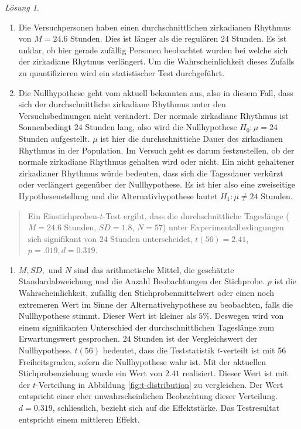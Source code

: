 \documentclass[
]{book}
\providecommand{\tightlist}{%
  \setlength{\itemsep}{0pt}\setlength{\parskip}{0pt}}
\theoremstyle{definition}
\theoremstyle{definition}
\theoremstyle{definition}
\theoremstyle{definition}
\theoremstyle{remark}
\newtheorem*{solution}{Lösung}
\begin{document}
\begin{solution}
\begin{enumerate}
\def\labelenumi{\alph{enumi})}
\tightlist
\item
  Die Versuchpersonen haben einen durchschnittlichen zirkadianen Rhythmus von \(M = 24.6\) Stunden. Dies ist länger als die regulären \(24\) Stunden. Es ist unklar, ob hier gerade zufällig Personen beobachtet wurden bei welche sich der zirkadiane Rhytmus verlängert. Um die Wahrscheinlichkeit dieses Zufalls zu quantifizieren wird ein statistischer Test durchgeführt.
\item
  Die Nullhypothese geht vom aktuell bekannten aus, also in diesem Fall, dass sich der durchschnittliche zirkadiane Rhythmus unter den Versuchsbedinungen nicht verändert. Der normale zirkadiane Rhythmus ist Sonnenbedingt \(24\) Stunden lang, also wird die Nullhypothese \(H_0: \mu = 24\) Stunden aufgestellt. \(\mu\) ist hier die durchschnittiche Dauer des zirkadianen Rhythmus in der Population. Im Versuch geht es darum festzustellen, ob der normale zirkadiane Rhythmus gehalten wird oder nicht. Ein nicht gehaltener zirkadianer Rhythmus würde bedeuten, dass sich die Tagesdauer verkürzt oder verlängert gegenüber der Nullhypothese. Es ist hier also eine zweiseitige Hypothesenstellung und die Alternativhypothese lautet \(H_1: \mu \neq 24\) Stunden.
\end{enumerate}

\begin{quote}
Ein Einstichproben-\(t\)-Test ergibt, dass die durchschnittliche Tageslänge (\(M = 24.6\) Stunden, \(SD = 1.8\), \(N = 57\)) unter Experimentalbedingungen sich signifikant von \(24\) Stunden unterscheidet, \(t(56) = 2.41\), \(p = .019, d = 0.319\).
\end{quote}

\begin{enumerate}
\def\labelenumi{\alph{enumi})}
\setcounter{enumi}{2}
\tightlist
\item
  \(M, SD,\) und \(N\) sind das arithmetische Mittel, die geschätzte Standardabweichung und die Anzahl Beobachtungen der Stichprobe. \(p\) ist die Wahrscheinlichkeit, zufällig den Stichprobenmittelwert oder einen noch extremeren Wert im Sinne der Alternativehypothese zu beobachten, falls die Nullhypothese stimmt. Dieser Wert ist kleiner als \(5\%\). Deswegen wird von einem signifikanten Unterschied der durchschnittlichen Tageslänge zum Erwartungswert gesprochen. \(24\) Stunden ist der Vergleichswert der Nullhypothese. \(t(56)\) bedeutet, dass die Teststatistik \(t\)-verteilt ist mit 56 Freiheitsgraden, sofern die Nullhypothese wahr ist. Mit der aktuellen Stichprobenziehung wurde ein Wert von \(2.41\) realisiert. Dieser Wert ist mit der \(t\)-Verteilung in Abbildung \ref{fig:t-distribution} zu vergleichen. Der Wert entspricht einer eher unwahrscheinlichen Beobachtung dieser Verteilung. \(d = 0.319\), schliesslich, bezieht sich auf die Effektstärke. Das Testresultat entspricht einem mittleren Effekt.
\end{enumerate}

\end{solution}
\end{document}
